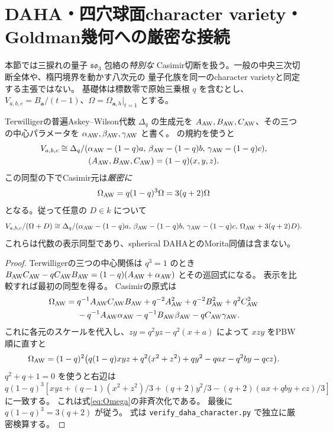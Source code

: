 \section{DAHA・四穴球面character variety・Goldman幾何への厳密な接続}
\label{sec:daha-character}
本節では三捩れの量子 $\mathfrak{so}_3$ 包絡の\emph{特別な}
Casimir切断を扱う。一般の中央三次切断全体や、楕円境界を動かす八次元の
量子化族を同一のcharacter varietyと同定する主張ではない。
基礎体は標数零で原始三乗根 $q$ を含むとし、
$V_{a,b,c}=B_{\mathbf a}/(t-1)$、$\Omega=\Omega_{\mathbf a,h}|_{t=1}$ とする。

\begin{theorem}
\label{thm:aw-casimir-exact}
Terwilligerの普遍Askey--Wilson代数 $\Delta_q$ の生成元を
$A_{\rm AW},B_{\rm AW},C_{\rm AW}$、その三つの中心パラメータを
$\alpha_{\rm AW},\beta_{\rm AW},\gamma_{\rm AW}$ と書く。
\cite[Definitions 2.1, 2.2, 2.6]{TerwilligerDAHA} の規約を使うと
\[
 \begin{gathered}
 V_{a,b,c}\cong\Delta_q/
 (\alpha_{\rm AW}-(1-q)a,\,
 \beta_{\rm AW}-(1-q)b,\,
 \gamma_{\rm AW}-(1-q)c),
 \\
 (A_{\rm AW},B_{\rm AW},C_{\rm AW})=(1-q)(x,y,z).
 \end{gathered}
\]
この同型の下でCasimir元は\emph{厳密に}
\begin{equation}\label{eq:aw-casimir-scale}
 \Omega_{\rm AW}=q(1-q)^3\Omega=3(q+2)\Omega
\end{equation}
となる。従って任意の $D\in k$ について
\[
 V_{a,b,c}/(\Omega+D)\cong
 \Delta_q/(\alpha_{\rm AW}-(1-q)a,\,
 \beta_{\rm AW}-(1-q)b,\,
 \gamma_{\rm AW}-(1-q)c,\,
 \Omega_{\rm AW}+3(q+2)D).
\]
これらは代数の表示同型であり、spherical DAHAとのMorita同値は含まない。
\end{theorem}
\begin{proof}
Terwilligerの三つの中心関係は $q^3=1$ のとき
$B_{\rm AW}C_{\rm AW}-qC_{\rm AW}B_{\rm AW}
 =(1-q)(A_{\rm AW}+\alpha_{\rm AW})$ とその巡回式になる。
表示を比較すれば最初の同型を得る。
Casimirの原式は
\[
 \begin{aligned}
 \Omega_{\rm AW}={}&q^{-1}A_{\rm AW}C_{\rm AW}B_{\rm AW}
 +q^{-2}A_{\rm AW}^2+q^{-2}B_{\rm AW}^2+q^2C_{\rm AW}^2
 \\
 &-q^{-1}A_{\rm AW}\alpha_{\rm AW}
 -q^{-1}B_{\rm AW}\beta_{\rm AW}-qC_{\rm AW}\gamma_{\rm AW}.
 \end{aligned}
\]
これに各元のスケールを代入し、$zy=q^2yz-q^2(x+a)$ によって
$xzy$ をPBW順に直すと
\[
 \Omega_{\rm AW}=(1-q)^2
 \bigl(q(1-q)xyz+q^2(x^2+z^2)+qy^2
      -qax-q^2by-qcz\bigr).
\]
$q^2+q+1=0$ を使うと右辺は
$q(1-q)^3[xyz+(q-1)(x^2+z^2)/3+(q+2)y^2/3
 -(q+2)(ax+qby+cz)/3]$ に一致する。
これは式\eqref{eq:Omega}の非斉次化である。
最後に $q(1-q)^3=3(q+2)$ が従う。
式は \texttt{verify\_daha\_character.py} で独立に厳密検算する。
\end{proof}


